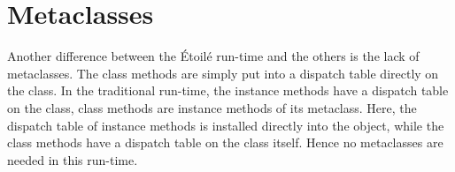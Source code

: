 \section{Metaclasses}

Another difference between the \'Etoil\'e run-time and the others is the lack of metaclasses. The class methods are simply put into a dispatch table directly on the class. In the traditional run-time, the instance methods have a dispatch table on the class, class methods are instance methods of its metaclass. Here, the dispatch table of instance methods is installed directly into the object, while the class methods have a dispatch table on the class itself. Hence no metaclasses are needed in this run-time.

